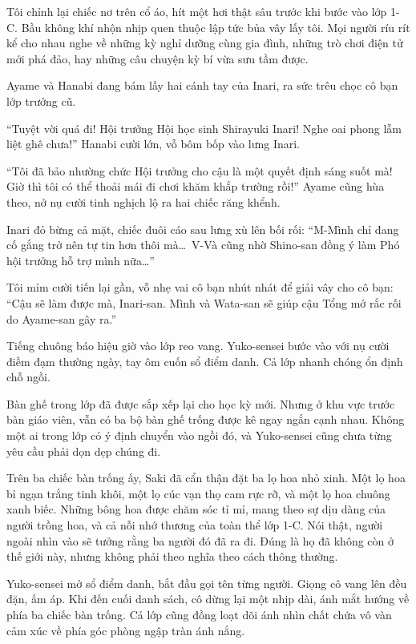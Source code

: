 \documentclass[../main.tex]{subfiles}
\begin{document}
Tôi chỉnh lại chiếc nơ trên cổ áo, hít một hơi thật sâu trước khi bước vào lớp 1-C. Bầu không khí nhộn nhịp quen thuộc lập tức bủa vây lấy tôi. Mọi người ríu rít kể cho nhau nghe về những kỳ nghỉ dưỡng cùng gia đình, những trò chơi điện tử mới phá đảo, hay những câu chuyện kỳ bí vừa sưu tầm được.

Ayame và Hanabi đang bám lấy hai cánh tay của Inari, ra sức trêu chọc cô bạn lớp trưởng cũ.

``Tuyệt vời quá đi! Hội trưởng Hội học sinh Shirayuki Inari! Nghe oai phong lẫm liệt ghê chưa!'' Hanabi cười lớn, vỗ bôm bốp vào lưng Inari.

``Tôi đã bảo nhường chức Hội trưởng cho cậu là một quyết định sáng suốt mà! Giờ thì tôi có thể thoải mái đi chơi khăm khắp trường rồi!'' Ayame cũng hùa theo, nở nụ cười tinh nghịch lộ ra hai chiếc răng khểnh.

Inari đỏ bừng cả mặt, chiếc đuôi cáo sau lưng xù lên bối rối: ``M-Mình chỉ đang cố gắng trở nên tự tin hơn thôi mà\dots\ V-Và cũng nhờ Shino-san đồng ý làm Phó hội trưởng hỗ trợ mình nữa\dots''

Tôi mỉm cười tiến lại gần, vỗ nhẹ vai cô bạn nhút nhát để giải vây cho cô bạn: ``Cậu sẽ làm được mà, Inari-san. Mình và Wata-san sẽ giúp cậu Tổng mớ rắc rối do Ayame-san gây ra.''

Tiếng chuông báo hiệu giờ vào lớp reo vang. Yuko-sensei bước vào với nụ cười điềm đạm thường ngày, tay ôm cuốn sổ điểm danh. Cả lớp nhanh chóng ổn định chỗ ngồi.

Bàn ghế trong lớp đã được sắp xếp lại cho học kỳ mới. Nhưng ở khu vực trước bàn giáo viên, vẫn có ba bộ bàn ghế trống được kê ngay ngắn cạnh nhau. Không một ai trong lớp có ý định chuyển vào ngồi đó, và Yuko-sensei cũng chưa từng yêu cầu phải dọn dẹp chúng đi.

Trên ba chiếc bàn trống ấy, Saki đã cẩn thận đặt ba lọ hoa nhỏ xinh. Một lọ hoa bỉ ngạn trắng tinh khôi, một lọ cúc vạn thọ cam rực rỡ, và một lọ hoa chuông xanh biếc. Những bông hoa được chăm sóc tỉ mỉ, mang theo sự dịu dàng của người trồng hoa, và cả nỗi nhớ thương của toàn thể lớp 1-C. Nói thật, người ngoài nhìn vào sẽ tưởng rằng ba người đó đã ra đi. Đúng là họ đã không còn ở thế giới này, nhưng không phải theo nghĩa theo cách thông thường.

Yuko-sensei mở sổ điểm danh, bắt đầu gọi tên từng người. Giọng cô vang lên đều đặn, ấm áp. Khi đến cuối danh sách, cô dừng lại một nhịp dài, ánh mắt hướng về phía ba chiếc bàn trống. Cả lớp cũng đồng loạt dõi ánh nhìn chất chứa vô vàn cảm xúc về phía góc phòng ngập tràn ánh nắng.
\end{document}
